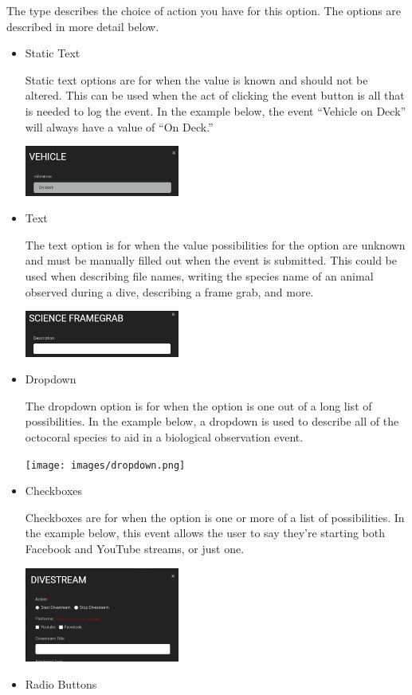 \documentclass[
  letterpaper,
  DIV=11,
  numbers=noendperiod]{scrreprt}
\begin{document}
The type describes the choice of action you have for this option. The
options are described in more detail below.

\begin{itemize}
\item
  Static Text

  Static text options are for when the value is known and should not be
  altered. This can be used when the act of clicking the event button is
  all that is needed to log the event. In the example below, the event
  ``Vehicle on Deck'' will always have a value of ``On Deck.''

  \includegraphics[width=0.4\textwidth,height=\textheight]{images/image15.png}
\item
  Text

  The text option is for when the value possibilities for the option are
  unknown and must be manually filled out when the event is submitted.
  This could be used when describing file names, writing the species
  name of an animal observed during a dive, describing a frame grab, and
  more.

  \includegraphics[width=0.4\textwidth,height=\textheight]{images/image10.png}
\item
  Dropdown

  The dropdown option is for when the option is one out of a long list
  of possibilities. In the example below, a dropdown is used to describe
  all of the octocoral species to aid in a biological observation event.

  \texttt{[image: images/dropdown.png]}
\item
  Checkboxes

  Checkboxes are for when the option is one or more of a list of
  possibilities. In the example below, this event allows the user to say
  they're starting both Facebook and YouTube streams, or just one.

  \includegraphics[width=0.4\textwidth,height=\textheight]{images/image23.png}
\item
  Radio Buttons


\end{itemize}
\end{document}
